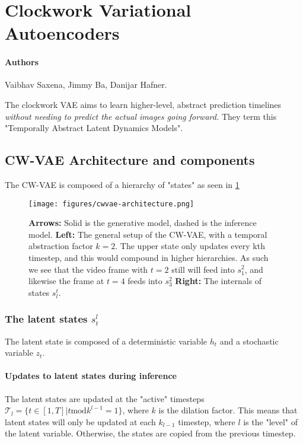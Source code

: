 \section{Clockwork Variational Autoencoders}
\paragraph{Authors} Vaibhav Saxena, Jimmy Ba, Danijar Hafner. \cite{saxena_clockwork_2021}

The clockwork VAE aims to learn higher-level, abstract prediction timelines \textit{without needing to predict the actual images going forward.}
They term this "Temporally Abstract Latent Dynamics Models".


\subsection{CW-VAE Architecture and components}
The CW-VAE is composed of a hierarchy of "states" as seen in \cref{fig:cwvae-architecture}

\begin{figure}[hb]
    \begin{small}
        \begin{center}
            \texttt{[image: figures/cwvae-architecture.png]}
        \end{center}
        \caption{
            \textbf{Arrows:} Solid is the generative model, dashed is the inference model. 
            \textbf{Left:} The general setup of the CW-VAE, with a temporal abstraction factor \(k=2\). 
            The upper state only updates every kth timestep, and this would compound in higher hierarchies. 
            As such we see that the video frame with \(t=2\) still will feed into \(s^2_1\), and likewise the frame at \(t=4\) feeds into \(s^2_3\)
            \textbf{Right:} The internals of states \(s_l^t\). 
            }
        \label{fig:cwvae-architecture}
    \end{small}
\end{figure}

\subsubsection{The latent states \(s^l_t\)}

The latent state is composed of a deterministic variable \(h_t\) and a stochastic variable \(z_t\). 


\paragraph{Updates to latent states during inference}
The latent states are updated at the "active" timesteps 
\(\mathcal{T}_l = \{ t \in [1, T] | t \mathrm{mod} k^{l-1} = 1 \}\), 
where \(k\) is the dilation factor.
This means that latent states will only be updated at each \(k_{l-1}\) timestep, where \(l\) is the "level" of the latent variable.
Otherwise, the states are copied from the previous timestep.

